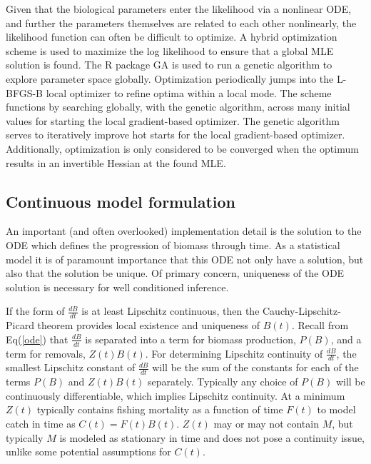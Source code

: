 %
Given that the biological parameters enter the likelihood via a nonlinear ODE,
and further the parameters themselves are related to each other nonlinearly,
the likelihood function can often be difficult to optimize. A hybrid optimization
scheme is used to maximize the log likelihood to ensure that a global MLE solution
is found. The R package GA \cite{scrucca_ga_2013, scrucca_extensions_2017} is
used to run a genetic algorithm to explore parameter space globally.
Optimization periodically jumps into the L-BFGS-B local optimizer to refine
optima within a local mode. The scheme functions by searching globally, with the genetic
algorithm, across many initial values for starting the local gradient-based optimizer.
The genetic algorithm serves to iteratively improve hot starts for the local
gradient-based optimizer. Additionally, optimization is only considered to be converged
when the optimum results in an invertible Hessian at the found MLE.

%
\subsection{Continuous model formulation}

%
An important (and often overlooked) implementation detail is the solution to the
ODE which defines the progression of biomass through time. %
As a statistical model it is of paramount importance that this ODE not only have a
solution, but also that the solution be unique. Of primary concern, uniqueness
of the ODE solution is necessary for well conditioned inference. %

%
If the form of $\frac{dB}{dt}$ is at least Lipschitz continuous, then the
Cauchy-Lipschitz-Picard theorem provides local existence and uniqueness of
$B(t)$. %
Recall from Eq(\ref{ode}) that $\frac{dB}{dt}$ is separated into
a term for biomass production, $P(B)$, and a term for removals, $Z(t)B(t)$.
For determining Lipschitz continuity of $\frac{dB}{dt}$,
the smallest Lipschitz constant of $\frac{dB}{dt}$ will be the sum of the
constants for each of the terms $P(B)$ and $Z(t)B(t)$ separately. Typically any
choice of $P(B)$ will be continuously differentiable, which implies Lipschitz
continuity. %
At a minimum $Z(t)$ typically contains fishing mortality as a function of time
$F(t)$ to model catch in time as $C(t)=F(t)B(t)$. $Z(t)$ may or may not contain
$M$, but typically $M$ is modeled as stationary in time and does not pose a
continuity issue, unlike some potential assumptions for $C(t)$.

